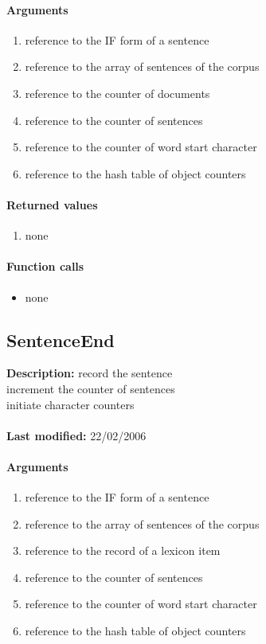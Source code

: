 \paragraph{Arguments}
\begin{enumerate}
\item reference to the IF form of a sentence
\item reference to the array of sentences of the corpus
\item reference to the counter of documents
\item reference to the counter of sentences
\item reference to the counter of word start character
\item reference to the hash table of object counters
\end{enumerate}

\paragraph{Returned values}
\begin{enumerate}
\item none
\end{enumerate}

\paragraph{Function calls}
\begin{itemize}
\item none
\end{itemize}

\subsection{SentenceEnd}
\textbf{Description:} record the sentence\\
increment the counter of sentences\\
initiate character counters\\
\\\textbf{Last modified:} 22/02/2006

\paragraph{Arguments}
\begin{enumerate}
\item reference to the IF form of a sentence
\item reference to the array of sentences of the corpus
\item reference to the record of a lexicon item
\item reference to the counter of sentences
\item reference to the counter of word start character
\item reference to the hash table of object counters
\end{enumerate}

